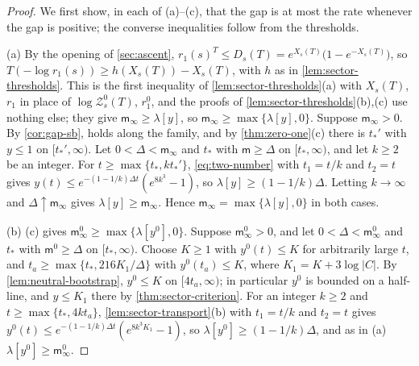 \documentclass[11pt,a4paper]{amsart}
\theoremstyle{definition}
\theoremstyle{remark}
\numberwithin{equation}{section}
\newcommand{\abs}[1]{\lvert #1\rvert}      %
\newcommand{\TT}{\mathbb{T}}               %
\newcommand{\Zc}{\mathcal{Z}}              %
\newcommand{\XT}[2]{X_{#1}(#2)}            %
\newcommand{\Dexc}[2]{D_{#1}(#2)}          %
\newcommand{\Mcirc}{\text{\upshape(M$^{\circ}$)}}   %
\begin{document}
\begin{proof}
We first show, in each of (a)--(c), that the gap is at most the rate whenever the gap is positive; the converse inequalities follow from the thresholds.

(a) By the opening of \cref{sec:ascent}, $r_1(s)^T\le\Dexc{s}{T}=e^{\XT{s}{T}}\bigl(1-e^{-\XT{s}{T}}\bigr)$, so $T(-\log r_1(s))\ge h(\XT{s}{T})-\XT{s}{T}$, with $h$ as in \cref{lem:sector-thresholds}. This is the first inequality of \cref{lem:sector-thresholds}\textup{(a)} with $\XT{s}{T}$, $r_1$ in place of $\log\Zc^0_s(T)$, $r_1^0$, and the proofs of \cref{lem:sector-thresholds}\textup{(b),(c)} use nothing else; they give $\mathsf m_\infty\ge\lambda[y]$, so $\mathsf m_\infty\ge\max\{\lambda[y],0\}$. Suppose $\mathsf m_\infty>0$. By \cref{cor:gap-sb}, \Mcirc{} holds along the family, and by \cref{thm:zero-one}\textup{(c)} there is $t_*'$ with $y\le1$ on $[t_*',\infty)$. Let $0<\Delta<\mathsf m_\infty$ and $t_*$ with $\mathsf m\ge\Delta$ on $[t_*,\infty)$, and let $k\ge2$ be an integer. For $t\ge\max\{t_*,kt_*'\}$, \eqref{eq:two-number} with $t_1=t/k$ and $t_2=t$ gives $y(t)\le e^{-(1-1/k)\Delta t}(e^{8k^3}-1)$, so $\lambda[y]\ge(1-1/k)\Delta$. Letting $k\to\infty$ and $\Delta\uparrow\mathsf m_\infty$ gives $\lambda[y]\ge\mathsf m_\infty$. Hence $\mathsf m_\infty=\max\{\lambda[y],0\}$ in both cases.

(b) \textup{(c)} gives $\mathsf m^0_\infty\ge\max\{\lambda[y^0],0\}$. Suppose $\mathsf m^0_\infty>0$, and let $0<\Delta<\mathsf m^0_\infty$ and $t_*$ with $\mathsf m^0\ge\Delta$ on $[t_*,\infty)$. Choose $K\ge1$ with $y^0(t)\le K$ for arbitrarily large $t$, and $t_a\ge\max\{t_*,216K_1/\Delta\}$ with $y^0(t_a)\le K$, where $K_1=K+3\log\abs{C}$. By \cref{lem:neutral-bootstrap}, $y^0\le K$ on $[4t_a,\infty)$; in particular $y^0$ is bounded on a half-line, and $y\le K_1$ there by \cref{thm:sector-criterion}. For an integer $k\ge2$ and $t\ge\max\{t_*,4kt_a\}$, \cref{lem:sector-transport}\textup{(b)} with $t_1=t/k$ and $t_2=t$ gives $y^0(t)\le e^{-(1-1/k)\Delta t}(e^{8k^3K_1}-1)$, so $\lambda[y^0]\ge(1-1/k)\Delta$, and as in (a) $\lambda[y^0]\ge\mathsf m^0_\infty$.


\end{proof}
\end{document}

